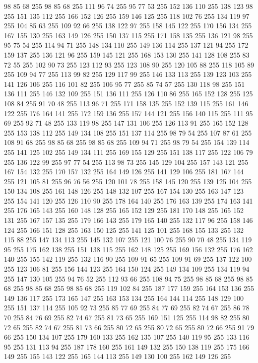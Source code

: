 98 85 68 255 98 85 68 255 111 96 74 255 95 77 53 255 152 136 110 255 138 123 98 255 151 135 112 255 166 152 126 255 159 146 125 255 118 102 76 255 134 119 97 255 104 85 63 255 109 92 66 255 138 122 97 255 158 145 122 255 170 156 134 255 167 155 130 255 163 149 126 255 150 137 115 255 171 158 135 255 136 121 98 255 95 75 54 255 114 94 71 255 148 134 110 255 149 136 114 255 137 121 94 255 172 159 137 255 136 121 96 255 159 145 121 255 168 153 130 255 141 128 108 255 83 72 55 255 102 90 73 255 123 112 93 255 123 108 90 255 120 105 88 255 118 105 89 255 109 94 77 255 113 99 82 255 129 117 99 255 146 133 113 255 139 123 103 255 141 126 106 255 116 101 82 255 106 95 77 255 85 74 57 255 130 118 98 255 151 136 111 255 146 132 109 255 151 136 111 255 126 110 86 255 165 152 128 255 125 108 84 255 91 70 48 255 113 96 71 255 171 158 135 255 152 139 115 255 161 146 122 255 176 164 141 255 172 159 136 255 157 144 121 255 156 140 115 255 111 95 69 255 92 71 48 255
133 119 98 255 147 131 106 255 126 113 91 255 165 152 128 255 153 138 112 255 149 134 108 255 151 137 114 255 98 79 54 255 107 87 61 255 108 91 68 255 98 85 68 255 98 85 68 255 109 94 71 255 98 79 54 255 154 139 114 255 141 125 102 255 149 134 111 255 169 155 129 255 151 138 117 255 122 106 79 255 136 122 99 255 97 77 54 255 113 98 73 255 145 129 104 255 157 143 121 255 167 154 132 255 170 157 132 255 164 149 126 255 141 129 106 255 181 167 144 255 121 105 81 255 96 76 56 255 120 101 78 255 158 145 120 255 139 125 104 255 150 134 108 255 161 148 126 255 148 132 107 255 167 154 130 255 163 147 123 255 154 141 120 255 126 110 90 255 178 164 140 255 176 163 139 255 174 163 141 255 176 165 143 255 160 148 128 255 165 152 129 255 181 170 148 255 165 152 131 255 167 157 135 255 179 166 143 255 179 165 140 255 132 117 96 255 158 146 124 255 166 151 128 255 163 150 125 255 141 125 101 255 168 155 133 255 132 115 88 255 147 134 113 255 145 132 107 255 121 100 76 255 90 70 48 255
134 119 95 255 175 162 138 255 151 138 115 255 162 148 125 255 169 156 132 255 176 162 140 255 155 142 119 255 132 116 90 255 109 91 65 255 109 91 69 255 137 122 100 255 123 106 81 255 156 144 123 255 164 150 124 255 149 134 109 255 134 119 94 255 147 130 105 255 94 76 52 255 112 93 66 255 108 94 75 255 98 85 68 255 98 85 68 255 98 85 68 255 98 85 68 255 119 102 84 255 187 177 159 255 164 153 136 255 149 136 117 255 173 165 147 255 163 153 134 255 164 144 114 255 148 129 100 255 151 137 114 255 105 92 73 255 85 77 69 255 84 77 69 255 82 74 67 255 86 78 70 255 84 76 69 255 82 74 67 255 81 73 65 255 169 151 125 255 114 98 82 255 80 72 65 255 82 74 67 255 81 73 66 255 80 72 65 255 80 72 65 255 80 72 66 255 91 79 66 255 150 134 107 255 179 160 133 255 162 135 107 255 140 119 95 255 133 116 95 255 131 113 94 255 187 178 160 255 161 149 132 255 150 138 119 255 175 166 149 255 155 143 122 255 165 144 113 255 149 130 100 255 162 149 126 255
